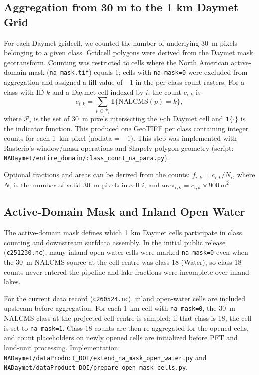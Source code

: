 \subsection{Aggregation from 30 m to the 1 km Daymet Grid}
For each Daymet gridcell, we counted the number of underlying 30~m pixels belonging to a given class. Gridcell polygons were derived from the Daymet mask geotransform. Counting was restricted to cells where the North American active-domain mask (\texttt{na\_mask.tif}) equals 1; cells with \texttt{na\_mask=0} were excluded from aggregation and assigned a fill value of \(-1\) in the per-class count rasters. For a class with ID \(k\) and a Daymet cell indexed by \(i\), the count \(c_{i,k}\) is
\[
  c_{i,k} = \sum_{p \in \mathcal{P}_i} \mathbf{1}\{ \text{NALCMS}(p) = k \},
\]
where \(\mathcal{P}_i\) is the set of 30~m pixels intersecting the \(i\)-th Daymet cell and \(\mathbf{1}\{\cdot\}\) is the indicator function. This produced one GeoTIFF per class containing integer counts for each 1~km pixel (nodata = \(-1\)). This step was implemented with Rasterio's window/mask operations and Shapely polygon geometry (script: \texttt{NADaymet/entire\_domain/class\_count\_na\_para.py}).

Optional fractions and areas can be derived from the counts: \(f_{i,k} = c_{i,k}/N_i\), where \(N_i\) is the number of valid 30~m pixels in cell \(i\); and \(\text{area}_{i,k} = c_{i,k} \times 900\,\text{m}^2\).

\subsection{Active-Domain Mask and Inland Open Water}
The active-domain mask defines which 1~km Daymet cells participate in class counting and downstream surfdata assembly. In the initial public release (\texttt{c251230.nc}), many inland open-water cells were marked \texttt{na\_mask=0} even when the 30~m NALCMS source at the cell centre was class 18 (Water), so class-18 counts never entered the pipeline and lake fractions were incomplete over inland lakes.

For the current data record (\texttt{c260524.nc}), inland open-water cells are included upstream before aggregation. For each 1~km cell with \texttt{na\_mask=0}, the 30~m NALCMS class at the projected cell centre is sampled; if that class is 18, the cell is set to \texttt{na\_mask=1}. Class-18 counts are then re-aggregated for the opened cells, and count placeholders on newly opened cells are initialized before PFT and land-unit processing. Implementation: \texttt{NADaymet/dataProduct\_DOI/extend\_na\_mask\_open\_water.py} and \texttt{NADaymet/dataProduct\_DOI/prepare\_open\_mask\_cells.py}.

